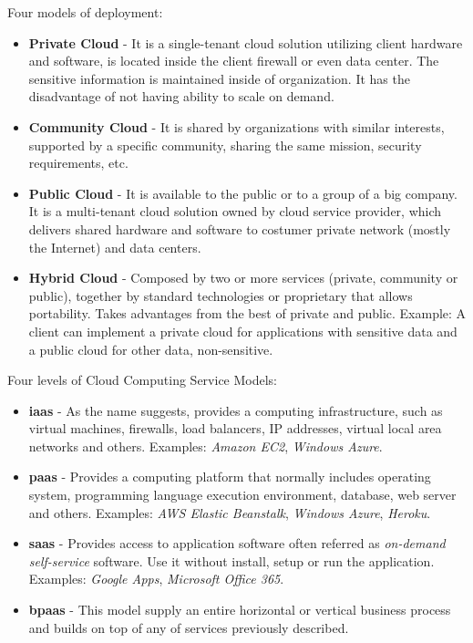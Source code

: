 Four models of deployment:
\begin{itemize}
	\item \textbf{Private Cloud}   - It is a single-tenant cloud solution utilizing client hardware and software, is located inside the client firewall or even data center. The sensitive information is maintained inside of organization. It has the disadvantage of not having ability to scale on demand.

	\item \textbf{Community Cloud} - It is shared by organizations with similar interests, supported by a specific community, sharing the same mission, security requirements, etc.

	\item \textbf{Public Cloud}    - It is available to the public or to a group of a big company. It is a multi-tenant cloud solution owned by cloud service provider, which delivers shared hardware and software to costumer private network (mostly the Internet) and data centers.

	\item \textbf{Hybrid Cloud}    - Composed by two or more services (private, community or public), together by standard technologies or proprietary that allows portability. Takes advantages from the best of private and public. Example: A client can implement a private cloud for applications with sensitive data and a public cloud for other data, non-sensitive.
\end{itemize}

Four levels of Cloud Computing Service Models:

\begin{itemize}
	\item \textbf{\acl{iaas}} - As the name suggests, provides a computing infrastructure, such as virtual machines, firewalls, load balancers, IP addresses, virtual local area networks and others. Examples: \textit{Amazon EC2}, \textit{Windows Azure}.

	\item \textbf{\acl{paas}} - Provides a computing platform that normally includes operating system, programming language execution environment, database, web server and others. Examples: \textit{AWS Elastic Beanstalk}, \textit{Windows Azure}, \textit{Heroku}.

	\item \textbf{\acl{saas}} - Provides access to application software often referred as \textit{on-demand self-service} software. Use it without install, setup or run the application.
	Examples: \textit{Google Apps}, \textit{Microsoft Office 365}.

	\item \textbf{\acl{bpaas}} - This model supply an entire horizontal or vertical business process and builds on top of any of services previously described.

\end{itemize}

